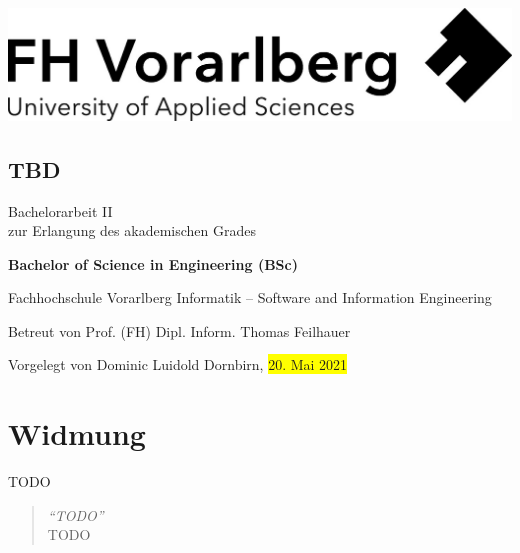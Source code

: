 \documentclass[a4paper,12pt,twoside]{scrreprt}
\begin{document}
\onehalfspacing %

{}
\cleardoublepage %
\thispagestyle{empty}
\begin{titlepage}
    \begin{flushright}
    \includegraphics[width=0.4\linewidth]{images/Logo_FHV.jpg}
    \end{flushright}
    \begin{flushleft}
    \section*{TBD}
    \vspace{1cm}

    Bachelorarbeit II\\
    zur Erlangung des akademischen Grades
    \vspace{0.5cm}

    \textbf{Bachelor of Science in Engineering (BSc)}

    \vspace{1cm}
    Fachhochschule Vorarlberg\newline
    Informatik – Software and Information Engineering

    \vspace{0.5cm}

    Betreut von\newline
    Prof. (FH) Dipl. Inform. Thomas Feilhauer

    \vspace{0.5cm}

    Vorgelegt von\newline
    Dominic Luidold\newline
    Dornbirn, \colorbox{yellow}{20. Mai 2021}
    \end{flushleft}
\end{titlepage}

\newpage
\section*{Widmung}
\label{sec:widmung}
TODO

\bigskip

\begin{quote}
    \begin{flushright}
        \textit{\enquote{TODO}}\\
        TODO
    \end{flushright}
\end{quote}
\end{document}
